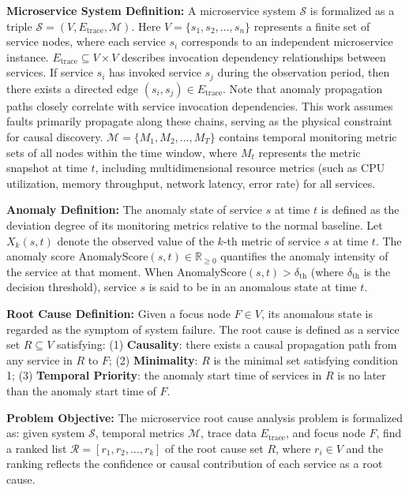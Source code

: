\documentclass[conference]{IEEEtran}
\begin{document}
\textbf{Microservice System Definition:} A microservice system $\mathcal{S}$ is formalized as a triple $\mathcal{S} = (V, E_{\text{trace}}, \mathcal{M})$. Here $V = \{s_1, s_2, \ldots, s_n\}$ represents a finite set of service nodes, where each service $s_i$ corresponds to an independent microservice instance. $E_{\text{trace}} \subseteq V \times V$ describes invocation dependency relationships between services. If service $s_i$ has invoked service $s_j$ during the observation period, then there exists a directed edge $(s_i, s_j) \in E_{\text{trace}}$. Note that anomaly propagation paths closely correlate with service invocation dependencies. This work assumes faults primarily propagate along these chains, serving as the physical constraint for causal discovery. $\mathcal{M} = \{M_1, M_2, \ldots, M_T\}$ contains temporal monitoring metric sets of all nodes within the time window, where $M_t$ represents the metric snapshot at time $t$, including multidimensional resource metrics (such as CPU utilization, memory throughput, network latency, error rate) for all services.

\textbf{Anomaly Definition:} The anomaly state of service $s$ at time $t$ is defined as the deviation degree of its monitoring metrics relative to the normal baseline. Let $X_k(s,t)$ denote the observed value of the $k$-th metric of service $s$ at time $t$. The anomaly score $\text{AnomalyScore}(s,t) \in \mathbb{R}_{\geq 0}$ quantifies the anomaly intensity of the service at that moment. When $\text{AnomalyScore}(s,t) > \delta_{\text{th}}$ (where $\delta_{\text{th}}$ is the decision threshold), service $s$ is said to be in an anomalous state at time $t$.

\textbf{Root Cause Definition:} Given a focus node $F \in V$, its anomalous state is regarded as the symptom of system failure. The root cause is defined as a service set $R \subseteq V$ satisfying: (1) \textbf{Causality}: there exists a causal propagation path from any service in $R$ to $F$; (2) \textbf{Minimality}: $R$ is the minimal set satisfying condition 1; (3) \textbf{Temporal Priority}: the anomaly start time of services in $R$ is no later than the anomaly start time of $F$.

\textbf{Problem Objective:} The microservice root cause analysis problem is formalized as: given system $\mathcal{S}$, temporal metrics $\mathcal{M}$, trace data $E_{\text{trace}}$, and focus node $F$, find a ranked list $\mathcal{R} = [r_1, r_2, \ldots, r_k]$ of the root cause set $R$, where $r_i \in V$ and the ranking reflects the confidence or causal contribution of each service as a root cause.
\end{document}
